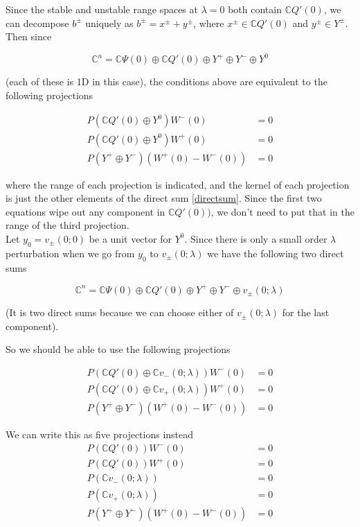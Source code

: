 \documentclass[12pt]{article}
\def\C{{\mathbb C}}
\begin{document}
\begin{enumerate}
Since the stable and unstable range spaces at $\lambda = 0$ both contain $\C Q'(0)$, we can decompose $b^\pm$ uniquely as $b^\pm = x^\pm + y^\pm$, where $x^\pm \in \C Q'(0)$ and $y^\pm \in Y^\pm$. Then since

\begin{equation}\label{directsum}
\C^n = \C\Psi(0) \oplus \C Q'(0) \oplus Y^+ \oplus Y^- \oplus Y^0
\end{equation}

(each of these is 1D in this case), the conditions above are equivalent to the following projections

\begin{align*}
P(\C Q'(0) \oplus Y^0 )W^-(0) &= 0 \\
P(\C Q'(0) \oplus Y^0 )W^+(0) &= 0 \\
P(Y^+ \oplus Y^-) (W^+(0) - W^-(0) ) &= 0
\end{align*}

where the range of each projection is indicated, and the kernel of each projection is just the other elements of the direct sum \eqref{directsum}. Since the first two equations wipe out any component in $\C Q'(0))$, we don't need to put that in the range of the third projection. \\

Let $y_0 = v_\pm(0; 0)$ be a unit vector for $Y^0$. Since there is only a small order $\lambda$ perturbation when we go from $y_0$ to $v_\pm(0; \lambda)$ we have the following two direct sums

\begin{equation}\label{directsum}
\C^n = \C\Psi(0) \oplus \C Q'(0) \oplus Y^+ \oplus Y^- \oplus v_\pm(0; \lambda)
\end{equation}

(It is two direct sums because we can choose either of $v_\pm(0; \lambda)$ for the last component). 

So we should be able to use the following projections

\begin{align*}
P(\C Q'(0) \oplus \C v_-(0; \lambda) )W^-(0) &= 0 \\
P(\C Q'(0) \oplus \C v_+(0; \lambda) )W^+(0) &= 0 \\
P(Y^+ \oplus Y^-) (W^+(0) - W^-(0) ) &= 0
\end{align*}

We can write this as five projections instead
\begin{align*}
P(\C Q'(0) )W^-(0) &= 0 \\
P(\C Q'(0) )W^+(0) &= 0 \\
P(\C v_-(0; \lambda)) &= 0 \\
P(\C v_+(0; \lambda)) &= 0 \\
P(Y^+ \oplus Y^-) (W^+(0) - W^-(0) ) &= 0
\end{align*}


\end{enumerate}
\end{document}
